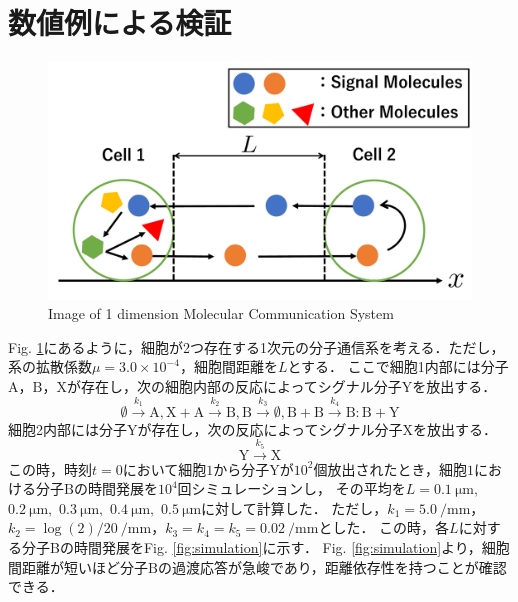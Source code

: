 \documentclass[twocolumn]{jarticle}
\begin{document}
\section{数値例による検証}
\begin{figure}[tb]
    \centering
    \includegraphics[width=\columnwidth] {figures/Images.pdf}
    \caption{Image of 1 dimension Molecular Communication System}
    \label{fig:image}
\end{figure}
Fig. \ref{fig:image}にあるように，細胞が2つ存在する1次元の分子通信系を考える．ただし，系の拡散係数$\mu=$$3.0\times10^{-4}$，細胞間距離を$L$とする．
ここで細胞1内部には分子$\mathrm{A}$，$\mathrm{B}$，$\mathrm{X}$が存在し，次の細胞内部の反応によってシグナル分子$\mathrm{Y}$を放出する．
\begin{equation}
    \emptyset \xrightarrow{k_1} \mathrm{A},\mathrm{X}+\mathrm{A} \xrightarrow{k_2} \mathrm{B}, \mathrm{B} \xrightarrow{k_3} \emptyset, \mathrm{B}+\mathrm{B}\xrightarrow{k_4} \mathrm{B:B} +\mathrm{Y}
\end{equation}
細胞2内部には分子$\mathrm{Y}$が存在し，次の反応によってシグナル分子$\mathrm{X}$を放出する．
\begin{equation}
    \mathrm{Y} \xrightarrow{k_5} \mathrm{X}
\end{equation}
この時，時刻$t=0$において細胞$1$から分子$\mathrm{Y}$が$10^2$個放出されたとき，細胞$1$における分子$\mathrm{B}$の時間発展を$10^4$回シミュレーションし，
その平均を$L=\SI{0.1}{\um},$ $\SI{0.2}{\um},$ $\SI{0.3}{\um},$ $\SI{0.4}{\um},$ $\SI{0.5}{\um}$に対して計算した．
ただし，$k_1 = \SI{5.0}{\per\mm}$，$k_2 = \log(2)/20\ \si{\per\mm}$，$k_3=k_4=k_5=\SI{0.02}{\per\mm}$とした．
この時，各$L$に対する分子Bの時間発展をFig. \ref{fig:simulation}に示す．
Fig. \ref{fig:simulation}より，細胞間距離が短いほど分子$\mathrm{B}$の過渡応答が急峻であり，距離依存性を持つことが確認できる．
\end{document}
